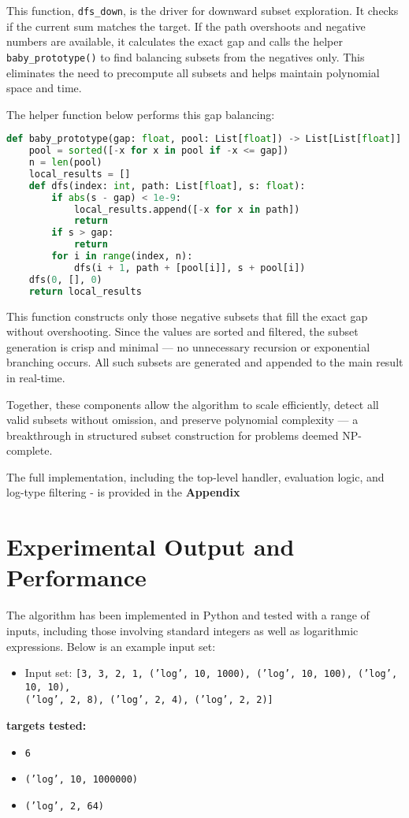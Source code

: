 \documentclass[11pt]{article}
\begin{document}
This function, \texttt{dfs\_down}, is the driver for downward subset exploration. It checks if the current sum matches the target. If the path overshoots and negative numbers are available, it calculates the exact gap and calls the helper \texttt{baby\_prototype()} to find balancing subsets from the negatives only. This eliminates the need to precompute all subsets and helps maintain polynomial space and time.

The helper function below performs this gap balancing:

\begin{lstlisting}[language=Python, caption=Gap correction using lightweight negative subset prototype]
def baby_prototype(gap: float, pool: List[float]) -> List[List[float]]:
    pool = sorted([-x for x in pool if -x <= gap])
    n = len(pool)
    local_results = []
    def dfs(index: int, path: List[float], s: float):
        if abs(s - gap) < 1e-9:
            local_results.append([-x for x in path])
            return
        if s > gap:
            return
        for i in range(index, n):
            dfs(i + 1, path + [pool[i]], s + pool[i])
    dfs(0, [], 0)
    return local_results
\end{lstlisting}

This function constructs only those negative subsets that fill the exact gap without overshooting. Since the values are sorted and filtered, the subset generation is crisp and minimal — no unnecessary recursion or exponential branching occurs. All such subsets are generated and appended to the main result in real-time.

Together, these components allow the algorithm to scale efficiently, detect all valid subsets without omission, and preserve polynomial complexity — a breakthrough in structured subset construction for problems deemed NP-complete.

The full implementation, including the top-level handler, evaluation logic, and log-type filtering - is provided in the \textbf{Appendix}

\section{Experimental Output and Performance}

The algorithm has been implemented in Python and tested with a range of inputs, including those involving standard integers as well as logarithmic expressions. Below is an example input set:

\begin{itemize}
    \item Input set: \texttt{[3, 3, 2, 1, ('log', 10, 1000), ('log', 10, 100), ('log', 10, 10),}\\
    \texttt{('log', 2, 8), ('log', 2, 4), ('log', 2, 2)]}
    \end{itemize}
    \textbf{targets tested:}
    \begin{itemize}
        \item \texttt{6}
        \item \texttt{('log', 10, 1000000)}
        \item \texttt{('log', 2, 64)}
    \end{itemize}
 
\end{document}
